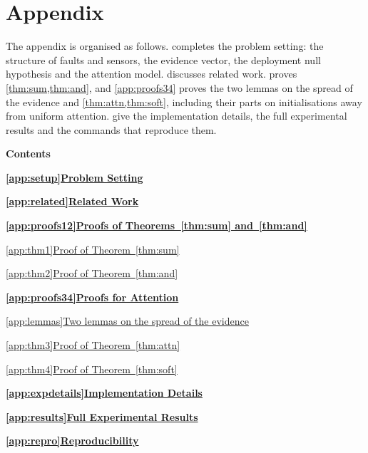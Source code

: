 \linespread{1.12}\selectfont
\setlength{\jot}{6pt}
\setlength{\parskip}{3pt}

\newcommand{\tocsec}[2]{\par\vspace{5pt}\noindent\hyperref[#1]{\textbf{\ref*{#1}\hspace{1em}#2}}\hfill\textbf{\pageref{#1}}\par}
\newcommand{\tocsub}[2]{\par\noindent\hspace*{2em}\hyperref[#1]{\ref*{#1}\hspace{1em}#2}\dotfill\pageref{#1}\par}
\newenvironment{restated}[1]{\par\medskip\noindent\textbf{#1 (restated).}\itshape\ }{\par\medskip}
\newcommand{\step}[1]{\par\medskip\noindent\textbf{#1}\ }

\section*{Appendix}

The appendix is organised as follows.  completes the problem setting: the structure of faults and sensors, the evidence vector, the deployment null hypothesis and the attention model.  discusses related work.  proves \cref{thm:sum,thm:and}, and \cref{app:proofs34} proves the two lemmas on the spread of the evidence and \cref{thm:attn,thm:soft}, including their parts on initialisations away from uniform attention.  give the implementation details, the full experimental results and the commands that reproduce them.

\vspace{6pt}
\noindent\textbf{\large Contents}
\vspace{2pt}

\tocsec{app:setup}{Problem Setting}
\tocsec{app:related}{Related Work}
\tocsec{app:proofs12}{Proofs of Theorems~\ref*{thm:sum} and~\ref*{thm:and}}
\tocsub{app:thm1}{Proof of Theorem~\ref*{thm:sum}}
\tocsub{app:thm2}{Proof of Theorem~\ref*{thm:and}}
\tocsec{app:proofs34}{Proofs for Attention}
\tocsub{app:lemmas}{Two lemmas on the spread of the evidence}
\tocsub{app:thm3}{Proof of Theorem~\ref*{thm:attn}}
\tocsub{app:thm4}{Proof of Theorem~\ref*{thm:soft}}
\tocsec{app:expdetails}{Implementation Details}
\tocsec{app:results}{Full Experimental Results}
\tocsec{app:repro}{Reproducibility}

